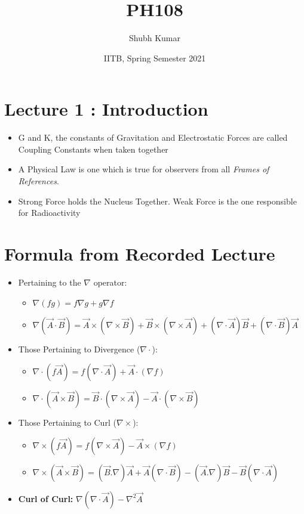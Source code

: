 \documentclass{article}
\title{PH108}
\author{Shubh Kumar}
\date{IITB, Spring Semester 2021}
\begin{document}
\maketitle

\section{Lecture 1 : Introduction}

\begin{itemize}
    \item G and K, the constants of Gravitation and Electrostatic Forces are called Coupling Constants when taken together

    \item A Physical Law is one which is true for observers from all \textit{Frames of References}.

    \item Strong Force holds the Nucleus Together. Weak Force is the one responsible for Radioactivity
\end{itemize}

\section{Formula from Recorded Lecture}
\begin{itemize}
    \item Pertaining to the $\nabla$ operator:
        \begin{itemize}
            \item $\nabla (fg) = f\nabla g + g\nabla f$
            \item $\nabla (\vec{A} \cdot \vec{B}) = \vec{A} \times ( \nabla \times \vec{B}) + \vec{B} \times ( \nabla \times \vec{A})+
            (\nabla \cdot \vec{A})\vec{B} + (\nabla \cdot \vec{B})\vec{A}$
        \end{itemize}




\item Those Pertaining to Divergence ($\nabla \cdot$):
        \begin{itemize}
            \item $\nabla \cdot (f\vec{A}) = f(\nabla \cdot \vec{A}) + \vec{A} \cdot (\nabla f)$
            \item $\nabla \cdot (\vec{A} \times \vec{B}) = \vec{B} \cdot (\nabla \times \vec{A})-\vec{A} \cdot (\nabla \times \vec{B})$
        \end{itemize}
\item Those Pertaining to Curl ($\nabla \times$):
\begin{itemize}
    \item $\nabla \times (f\vec{A}) = f(\nabla \times \vec{A}) - \vec{A} \times (\nabla f)$
    \item $\nabla \times (\vec{A} \times \vec{B}) = (\vec{B}. \nabla)\vec{A} + \vec{A} (\nabla \cdot \vec{B})-(\vec{A}. \nabla)\vec{B}-\vec{B} (\nabla \cdot \vec{A})$
\end{itemize}

\item \textbf{Curl of Curl:} $\nabla (\nabla \cdot \vec{A})- \nabla^{2}\vec{A}$
\end{itemize}
\end{document}
